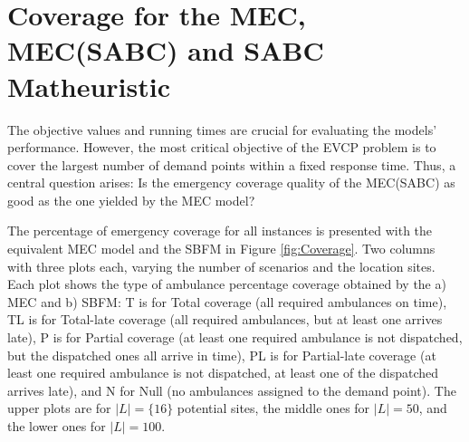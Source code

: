\section{Coverage for the MEC, MEC(SABC) and SABC Matheuristic}

 The objective values and running times are crucial for evaluating the models' performance. However, the most critical objective of the EVCP problem is to cover the largest number of demand points within a fixed response time. Thus, a central question arises: Is the emergency coverage quality of the MEC(SABC) as good as the one yielded by the MEC model?  
 

The percentage of emergency coverage for all instances is presented with the equivalent MEC model and the SBFM in Figure \ref{fig:Coverage}. Two columns with three plots each, varying the number of scenarios and the location sites. Each plot shows the type of ambulance percentage coverage obtained by the a) MEC and b) SBFM: T is for Total coverage (all required ambulances on time), TL is for Total-late coverage (all required ambulances, but at least one arrives late), P is for Partial coverage (at least one required ambulance is not dispatched, but the dispatched ones all arrive in time), PL is for Partial-late coverage (at least one required ambulance is not dispatched, at least one of the dispatched arrives late), and N for Null (no ambulances assigned to the demand point). The upper plots are for  $|L|=\{16\}$ potential sites, the middle ones for $|L|=50$, and the lower ones for $|L|=100$.

